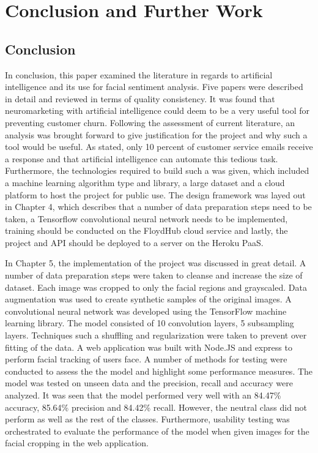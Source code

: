 \chapter{Conclusion and Further Work}

\section{Conclusion}
In conclusion, this paper examined the literature in regards to artificial intelligence and its use for facial sentiment analysis. Five papers were described in detail and reviewed in terms of quality consistency. It was found that neuromarketing with artificial intelligence could deem to be a very useful tool for preventing customer churn. Following the assessment of current literature, an analysis was brought forward to give justification for the project and why such a tool would be useful. As stated, only 10 percent of customer service emails receive a response and that artificial intelligence can automate this tedious task. Furthermore, the technologies required to build such a was given, which included a machine learning algorithm type and library, a large dataset and a cloud platform to host the project for public use. The design framework was layed out in Chapter 4, which describes that a number of data preparation steps need to be taken, a Tensorflow convolutional neural network needs to be implemented, training should be conducted on the FloydHub cloud service and lastly, the project and API should be deployed to a server on the Heroku PaaS. 

In Chapter 5, the implementation of the project was discussed in great detail. A number of data preparation steps were taken to cleanse and increase the size of dataset. Each image was cropped to only the facial regions and grayscaled. Data augmentation was used to create synthetic samples of the original images. A convolutional neural network was developed using the TensorFlow machine learning library. The model consisted of 10 convolution layers, 5 subsampling layers. Techniques such a shuffling and regularization were taken to prevent over fitting of the data. A web application was built with Node.JS and express to perform facial tracking of users face. 
A number of methods for testing were conducted to assess the the model and highlight some performance measures. The model was tested on unseen data and the precision, recall and accuracy were analyzed. It was seen that the model performed very well with an 84.47\% accuracy, 85.64\% precision and 84.42\% recall. However, the neutral class did not perform as well as the rest of the classes. Furthermore, usability testing was orchestrated to evaluate the performance of the model when given images for the facial cropping in the web application. 

